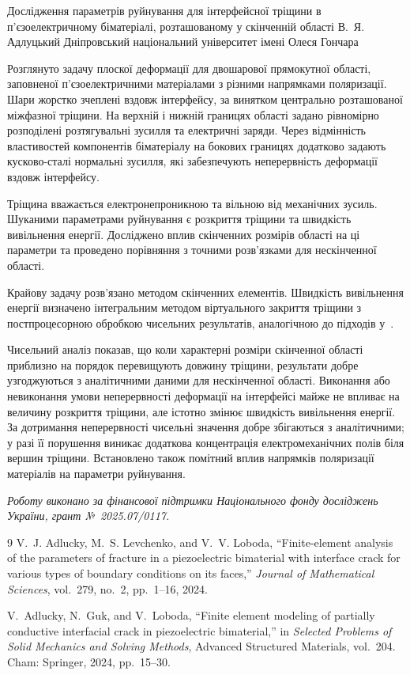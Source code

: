 \ReportHeading
  {Дослідження параметрів руйнування для інтерфейсної тріщини в п’єзоелектричному біматеріалі, розташованому у скінченній області}
  {В.~Я. Адлуцький}
  {Дніпровський національний університет імені Олеся Гончара}
  {}

Розглянуто задачу плоскої деформації для двошарової прямокутної області, заповненої п’єзоелектричними матеріалами з різними напрямками поляризації. Шари жорстко зчеплені вздовж інтерфейсу, за винятком центрально розташованої міжфазної тріщини. На верхній і нижній границях області задано рівномірно розподілені розтягувальні зусилля та електричні заряди. Через відмінність властивостей компонентів біматеріалу на бокових границях додатково задають кусково-сталі нормальні зусилля, які забезпечують неперервність деформації вздовж інтерфейсу.

Тріщина вважається електронепроникною та вільною від механічних зусиль. Шуканими параметрами руйнування є розкриття тріщини та швидкість вивільнення енергії. Досліджено вплив скінченних розмірів області на ці параметри та проведено порівняння з точними розв’язками для нескінченної області.

Крайову задачу розв’язано методом скінченних елементів. Швидкість вивільнення енергії визначено інтегральним методом віртуального закриття тріщини з постпроцесорною обробкою чисельних результатів, аналогічною до підходів у~\cite{adlucky:2024jms,adlucky:2024asm}.

Чисельний аналіз показав, що коли характерні розміри скінченної області приблизно на порядок перевищують довжину тріщини, результати добре узгоджуються з аналітичними даними для нескінченної області. Виконання або невиконання умови неперервності деформації на інтерфейсі майже не впливає на величину розкриття тріщини, але істотно змінює швидкість вивільнення енергії. За дотримання неперервності чисельні значення добре збігаються з аналітичними; у разі її порушення виникає додаткова концентрація електромеханічних полів біля вершин тріщини. Встановлено також помітний вплив напрямків поляризації матеріалів на параметри руйнування.

\textit{Роботу виконано за фінансової підтримки Національного фонду досліджень України, грант №~2025.07/0117.}

\begin{thebibliography}{9}
V.~J. Adlucky, M.~S. Levchenko, and V.~V. Loboda,
``Finite-element analysis of the parameters of fracture in a piezoelectric bimaterial with interface crack for various types of boundary conditions on its faces,''
\emph{Journal of Mathematical Sciences}, vol.~279, no.~2, pp.~1--16, 2024.

V.~Adlucky, N.~Guk, and V.~Loboda,
``Finite element modeling of partially conductive interfacial crack in piezoelectric bimaterial,''
in \emph{Selected Problems of Solid Mechanics and Solving Methods}, Advanced Structured Materials, vol.~204.
Cham: Springer, 2024, pp.~15--30.
\end{thebibliography}
